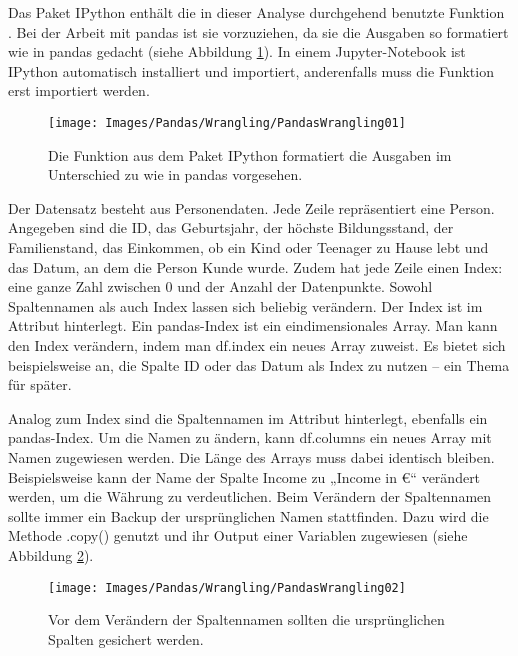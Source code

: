 Das Paket IPython enthält die in dieser Analyse durchgehend benutzte Funktion . Bei der Arbeit mit pandas ist sie  vorzuziehen, da sie die Ausgaben so formatiert wie in pandas gedacht (siehe Abbildung \ref{PandasWrangling01}). In einem Jupyter-Notebook ist IPython automatisch installiert und importiert, anderenfalls muss die Funktion erst importiert werden.

\begin{figure}
  \centering
  \texttt{[image: Images/Pandas/Wrangling/PandasWrangling01]}    
  \caption{Die Funktion  aus dem Paket IPython formatiert die Ausgaben im Unterschied zu  wie in pandas vorgesehen. } \label{PandasWrangling01}
\end{figure}



Der Datensatz besteht aus Personendaten. Jede Zeile repräsentiert eine Person. Angegeben sind die ID, das Geburtsjahr, der höchste Bildungsstand, der Familienstand, das Einkommen, ob ein Kind oder Teenager zu Hause lebt und das Datum, an dem die Person Kunde wurde. Zudem hat jede Zeile einen Index: eine ganze Zahl zwischen 0 und der Anzahl der Datenpunkte. Sowohl Spaltennamen als auch Index lassen sich beliebig verändern. Der Index ist im Attribut  hinterlegt. Ein pandas-Index ist ein eindimensionales Array. Man kann den Index verändern, indem man df.index ein neues Array zuweist. Es bietet sich beispielsweise an, die Spalte ID oder das Datum als Index zu nutzen -- ein Thema für später.

Analog zum Index sind die Spaltennamen im Attribut  hinterlegt, ebenfalls ein pandas-Index. Um die Namen zu ändern, kann df.columns ein neues Array mit Namen zugewiesen werden. Die Länge des Arrays muss dabei identisch bleiben. Beispielsweise kann der Name der Spalte Income zu „Income in €“ verändert werden, um die Währung zu verdeutlichen. Beim Verändern der Spaltennamen sollte immer ein Backup der ursprünglichen Namen stattfinden. Dazu wird die Methode .copy() genutzt und ihr Output einer Variablen zugewiesen (siehe Abbildung \ref{PandasWrangling02}).

\begin{figure}
    \centering
    \texttt{[image: Images/Pandas/Wrangling/PandasWrangling02]}    
    \caption{Vor dem Verändern der Spaltennamen sollten die ursprünglichen Spalten gesichert werden.} \label{PandasWrangling02}
\end{figure}


